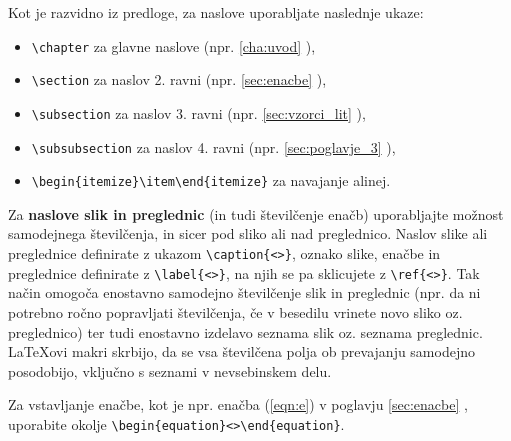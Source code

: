 Kot je razvidno iz predloge, za naslove uporabljate naslednje ukaze:
\begin{itemize}
	\item \verb|\chapter| za glavne naslove (npr. \ref{cha:uvod} ),
	\item \verb|\section| za naslov 2. ravni (npr. \ref{sec:enacbe} ),
	\item \verb|\subsection| za naslov 3. ravni (npr. \ref{sec:vzorci_lit} ),
	\item \verb|\subsubsection| za naslov 4. ravni (npr. \ref{sec:poglavje_3} ),
	\item \verb|\begin{itemize}\item\end{itemize}| za navajanje alinej.
\end{itemize}

Za \textbf{naslove slik in preglednic} (in tudi številčenje enačb) uporabljajte možnost samodejnega številčenja, in sicer pod sliko ali nad preglednico. Naslov slike ali preglednice definirate z ukazom \verb|\caption{<>}|, oznako slike, enačbe in preglednice definirate z \verb|\label{<>}|, na njih se pa sklicujete z \verb|\ref{<>}|. Tak način omogoča enostavno samodejno številčenje slik in preglednic (npr. da ni potrebno ročno popravljati številčenja, če v besedilu vrinete novo sliko oz. preglednico) ter tudi enostavno izdelavo seznama slik oz. seznama preglednic. \LaTeX ovi makri skrbijo, da se vsa številčena polja ob prevajanju samodejno posodobijo, vključno s seznami v nevsebinskem delu.

Za vstavljanje enačbe, kot je npr. enačba (\ref{eqn:e}) v poglavju \ref{sec:enacbe} , uporabite okolje \verb|\begin{equation}<>\end{equation}|.

